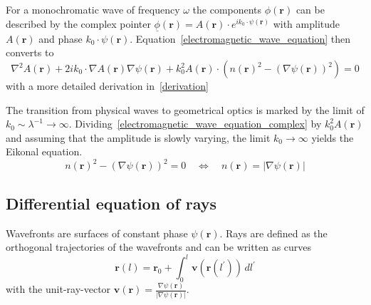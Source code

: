 For a monochromatic wave of frequency \(\omega \) the components \(\phi(\mathbf{r})\) can be described by the complex pointer \(\underline{\phi}(\mathbf{r}) = A(\mathbf{r}) \cdot e^{i k_0 \cdot \psi(\mathbf{r})}\) with amplitude \(A(\mathbf{r})\) and phase \(k_0 \cdot \psi(\mathbf{r})\).
Equation~\eqref{electromagnetic_wave_equation} then converts to 
\begin{equation}\label{electromagnetic_wave_equation_complex}
    \nabla^2 A(\mathbf{r}) + 2ik_0 \cdot \nabla A(\mathbf{r}) \nabla \psi(\mathbf{r}) + k_0^2 A(\mathbf{r}) \cdot ({n(\mathbf{r})}^2 - {(\nabla \psi(\mathbf{r}))}^2) = 0
\end{equation}
with a more detailed derivation in~\ref{derivation}

The transition from physical waves to geometrical optics is marked by the limit of \(k_0 \sim  \lambda^{-1} \rightarrow \infty \).
Dividing~\eqref{electromagnetic_wave_equation_complex} by \(k_0^2 A(\mathbf{r})\) and assuming that the amplitude is slowly varying, the limit \(k_0 \rightarrow \infty \) yields the Eikonal equation.
\begin{equation}
    {n(\mathbf{r})}^2 - {(\nabla \psi(\mathbf{r}))}^2 = 0 \quad \Leftrightarrow \quad n(\mathbf{r}) = |\nabla \psi(\mathbf{r})|
\end{equation}


\subsection{Differential equation of rays}
Wavefronts are surfaces of constant phase \(\psi(\mathbf{r})\).
Rays are defined as the orthogonal trajectories of the wavefronts and can be written as curves
\begin{equation}
    \mathbf{r}(l) = \mathbf{r}_0 + \int_{0}^{l} \mathbf{v}(\mathbf{r}(l^{\prime})) \, dl^{\prime}
\end{equation}
with the unit-ray-vector \(\mathbf{v}(\mathbf{r}) = \frac{\nabla \psi(\mathbf{r})}{|\nabla \psi(\mathbf{r})|}\).


